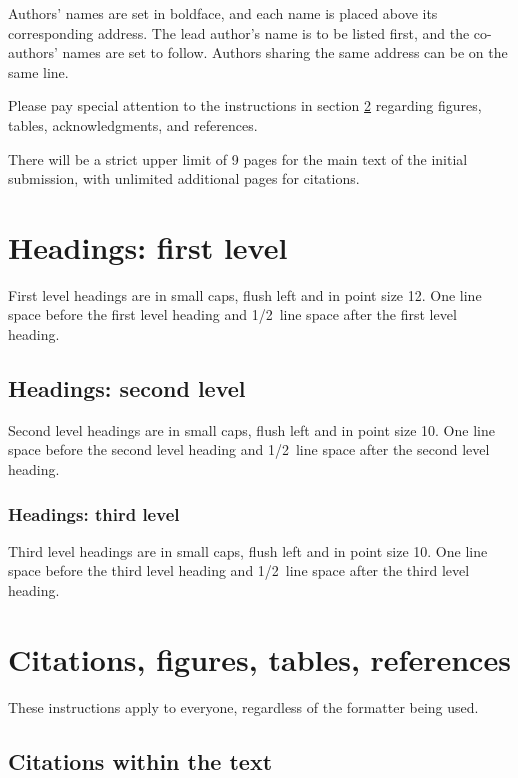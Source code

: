 \documentclass{article} %
\begin{document}
Authors' names are
set in boldface, and each name is placed above its corresponding
address. The lead author's name is to be listed first, and
the co-authors' names are set to follow. Authors sharing the
same address can be on the same line.

Please pay special attention to the instructions in section \ref{others}
regarding figures, tables, acknowledgments, and references.


There will be a strict upper limit of 9 pages for the main text of the initial submission, with unlimited additional pages for citations.

\section{Headings: first level}
\label{headings}

First level headings are in small caps,
flush left and in point size 12. One line space before the first level
heading and 1/2~line space after the first level heading.

\subsection{Headings: second level}

Second level headings are in small caps,
flush left and in point size 10. One line space before the second level
heading and 1/2~line space after the second level heading.

\subsubsection{Headings: third level}

Third level headings are in small caps,
flush left and in point size 10. One line space before the third level
heading and 1/2~line space after the third level heading.

\section{Citations, figures, tables, references}
\label{others}

These instructions apply to everyone, regardless of the formatter being used.

\subsection{Citations within the text}
\end{document}
